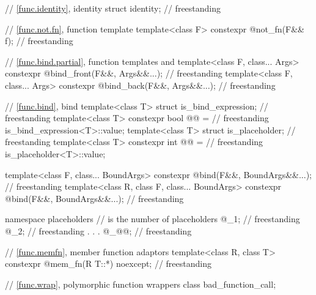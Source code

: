 \begin{codeblock}
{  // \ref{func.identity}, identity
  struct identity;                                                                  // freestanding

  // \ref{func.not.fn}, function template 
  template<class F> constexpr @\unspec@ not_fn(F&& f);                            // freestanding

  // \ref{func.bind.partial}, function templates  and 
  template<class F, class... Args>
    constexpr @\unspec@ bind_front(F&&, Args&&...);                               // freestanding
  template<class F, class... Args>
    constexpr @\unspec@ bind_back(F&&, Args&&...);                                // freestanding

  // \ref{func.bind}, bind
  template<class T> struct is_bind_expression;                                      // freestanding
  template<class T>
    constexpr bool @@ =                                           // freestanding
      is_bind_expression<T>::value;
  template<class T> struct is_placeholder;                                          // freestanding
  template<class T>
    constexpr int @@ =                                                // freestanding
      is_placeholder<T>::value;

  template<class F, class... BoundArgs>
    constexpr @\unspec@ bind(F&&, BoundArgs&&...);                                // freestanding
  template<class R, class F, class... BoundArgs>
    constexpr @\unspec@ bind(F&&, BoundArgs&&...);                                // freestanding

  namespace placeholders {
    //  is the  number of placeholders
    @\seebelownc@ _1;                                                                   // freestanding
    @\seebelownc@ _2;                                                                   // freestanding
               .
               .
               .
    @\seebelownc@ _@@;                                                                   // freestanding
  }

  // \ref{func.memfn}, member function adaptors
  template<class R, class T>
    constexpr @\unspec@ mem_fn(R T::*) noexcept;                                  // freestanding

  // \ref{func.wrap}, polymorphic function wrappers
  class bad_function_call;

}
\end{codeblock}
